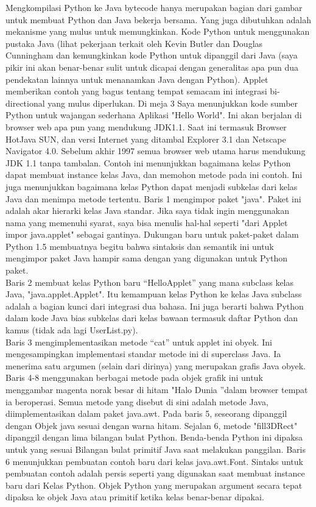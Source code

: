 \documentclass[12pt,a4paper]{article}
\begin{document}
Mengkompilasi Python ke Java bytecode hanya merupakan bagian dari gambar untuk membuat Python dan Java bekerja bersama. Yang juga dibutuhkan adalah mekanisme yang mulus untuk memungkinkan. Kode Python untuk menggunakan pustaka Java (lihat pekerjaan terkait oleh
Kevin Butler dan Douglas Cunningham dan kemungkinkan kode Python untuk dipanggil dari Java (saya pikir ini akan benar-benar sulit untuk dicapai dengan generalitas apa pun dua pendekatan lainnya untuk menanamkan Java dengan Python). Applet memberikan contoh yang bagus tentang tempat semacam ini integrasi bi-directional yang mulus diperlukan. Di meja 3 Saya menunjukkan kode sumber Python untuk wajangan sederhana Aplikasi "Hello World". Ini akan berjalan di browser web apa pun yang mendukung JDK1.1. Saat ini termasuk Browser HotJava SUN, dan versi Internet yang ditambal Explorer 3.1 dan Netscape Navigator 4.0. Sebelum akhir 1997 semua browser web utama harus mendukung JDK 1.1 tanpa tambalan. Contoh ini menunjukkan bagaimana kelas Python dapat membuat instance kelas Java, dan memohon metode pada ini contoh. Ini juga menunjukkan bagaimana kelas Python dapat menjadi subkelas dari kelas Java dan menimpa metode tertentu. Baris 1 mengimpor paket "java". Paket ini adalah akar hierarki kelas Java standar. Jika saya tidak ingin menggunakan nama yang memenuhi syarat, saya bisa menulis hal-hal seperti "dari Applet impor java.applet" sebagai gantinya. Dukungan baru untuk paket-paket dalam Python 1.5 membuatnya begitu bahwa sintaksis dan semantik ini untuk mengimpor paket Java hampir sama dengan yang digunakan untuk Python paket.\\

Baris 2 membuat kelas Python baru “HelloApplet” yang mana subclass kelas Java, "java.applet.Applet". Itu kemampuan kelas Python ke kelas Java subclass adalah a bagian kunci dari integrasi dua bahasa. Ini juga berarti bahwa Python dalam kode Java bias subkelas dari kelas bawaan termasuk daftar Python dan kamus (tidak ada lagi UserList.py).\\

Baris 3 mengimplementasikan metode “cat” untuk applet ini obyek. Ini mengesampingkan implementasi standar metode ini di superclass Java. Ia menerima satu argumen (selain dari dirinya) yang merupakan grafis Java obyek.\\

Baris 4-8 menggunakan berbagai metode pada objek grafik ini untuk menggambar magenta norak besar di hitam "Halo Dunia ”dalam browser tempat ia beroperasi. Semua metode yang disebut di sini adalah metode Java, diimplementasikan dalam paket java.awt. Pada baris 5, seseorang dipanggil dengan Objek java sesuai dengan warna hitam. Sejalan 6, metode "fill3DRect" dipanggil dengan lima bilangan bulat Python. Benda-benda Python ini dipaksa untuk yang sesuai Bilangan bulat primitif Java saat melakukan panggilan. Baris 6 menunjukkan pembuatan contoh baru dari kelas java.awt.Font. Sintaks untuk pembuatan contoh adalah persis seperti yang digunakan saat membuat instance baru dari Kelas Python. Objek Python yang merupakan argument secara tepat dipaksa ke objek Java atau primitif ketika kelas benar-benar dipakai.\\
\end{document}
